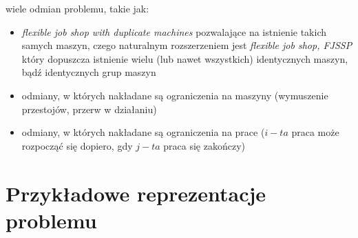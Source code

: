 \documentclass[12pt, a4paper]{report}
\begin{document}
  wiele odmian problemu, takie jak:
  \begin{itemize}
    \item \textit{flexible job shop with duplicate machines} pozwalające na istnienie takich samych maszyn, czego naturalnym
    rozszerzeniem jest \textit{flexible job shop, FJSSP} który dopuszcza istnienie wielu (lub nawet wszystkich) identycznych maszyn, 
    bądź identycznych grup maszyn
    \item odmiany, w których nakładane są ograniczenia na maszyny (wymuszenie przestojów, przerw w działaniu)
    \item odmiany, w których nakładane są ograniczenia na prace ($i-ta$ praca może rozpocząć się dopiero,
    gdy $j-ta$ praca się zakończy)
  \end{itemize}

\chapter{Przykładowe reprezentacje problemu}
\end{document}
